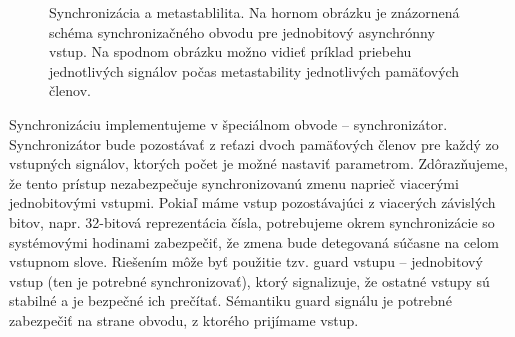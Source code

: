 \begin{figure}
    \centering
    \vfill
    \caption[Synchronizácia a metastablilita]{Synchronizácia a metastablilita. Na hornom obrázku je znázornená schéma synchronizačného obvodu pre jednobitový asynchrónny vstup. Na spodnom obrázku možno vidieť príklad priebehu jednotlivých signálov počas metastability jednotlivých pamäťových členov.}
    \label{obr:synchronizer}
\end{figure}

Synchronizáciu implementujeme v špeciálnom obvode -- synchronizátor. Synchronizátor bude pozostávať z reťazi dvoch pamäťových členov pre každý zo vstupných signálov, ktorých počet je možné nastaviť parametrom. Zdôrazňujeme, že tento prístup nezabezpečuje synchronizovanú zmenu naprieč viacerými jednobitovými vstupmi. Pokiaľ máme vstup pozostávajúci z viacerých závislých bitov, napr. 32-bitová reprezentácia čísla, potrebujeme okrem synchronizácie so systémovými hodinami zabezpečiť, že zmena bude detegovaná súčasne na celom vstupnom slove. Riešením môže byť použitie tzv. guard vstupu -- jednobitový vstup (ten je potrebné synchronizovať), ktorý signalizuje, že ostatné vstupy sú stabilné a je bezpečné ich prečítať. Sémantiku guard signálu je potrebné zabezpečiť na strane obvodu, z ktorého prijímame vstup.

